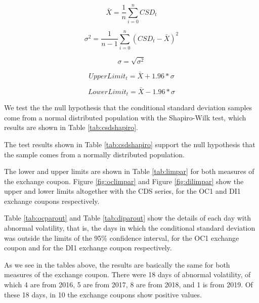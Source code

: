 \documentclass[cic,tc, english]{iiufrgs}
\begin{document}
    $$\bar{X} = \frac{1}{n} \displaystyle\sum_{i=0}^{n} CSD_t$$

    $$\sigma^2 = \frac{1}{n-1} \displaystyle\sum_{i=0}^{n} (CSD_t - \bar{X})^2$$

    $$\sigma = \sqrt{\sigma^2}$$

    \begin{equation}
        \label{eqn:upp}
        UpperLimit_t = \bar{X} + 1.96 * \sigma
    \end{equation}

    \begin{equation}
        \label{eqn:lop}
        LowerLimit_t = \bar{X} - 1.96 * \sigma
    \end{equation}

    We test the the null hypothesis that the conditional standard deviation samples come from a normal distributed population with the Shapiro-Wilk test, which results are shown in Table \ref{tab:csdshapiro}.

    

    The test results shown in Table \ref{tab:csdshapiro} support the null hypothesis that the sample comes from a normally distributed population.

    The lower and upper limits are shown in Table \ref{tab:limpar} for both measures of the exchange coupon. Figure \ref{fig:oclimpar} and Figure \ref{fig:dilimpar} show the upper and lower limits altogether with the CDS series, for the OC1 and DI1 exchange coupons respectively.

    

    

    

    Table \ref{tab:ocparout} and Table \ref{tab:diparout} show the details of each day with abnormal volatility, that is, the days in which the conditional standard deviation was outside the limits of the 95\% confidence interval, for the OC1 exchange coupon and for the DI1 exchange coupon respectively.

    

    

    As we see in the tables above, the results are basically the same for both measures of the exchange coupon. There were 18 days of abnormal volatility, of which 4 are from 2016, 5 are from 2017, 8 are from 2018, and 1 is from 2019. Of these 18 days, in 10 the exchange coupons show positive values.
\end{document}

